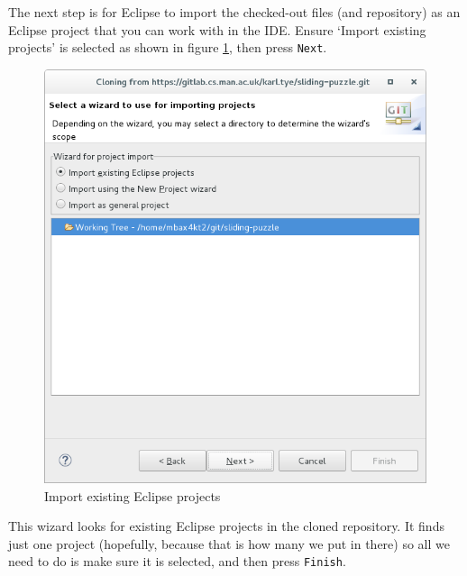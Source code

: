 \documentclass[
]{book}
\begin{document}
The next step is for Eclipse to import the checked-out files (and repository) as an Eclipse project that you can work with in the IDE. Ensure `Import existing projects' is selected as shown in figure \ref{fig:importExistingEclipseProjects-fig}, then press \texttt{Next}.

\begin{figure}

{\centering \includegraphics[width=0.8\linewidth]{images/importExistingEclipseProjects} 

}

\caption{Import existing Eclipse projects }\label{fig:importExistingEclipseProjects-fig}
\end{figure}

This wizard looks for existing Eclipse projects in the cloned repository. It finds just one project (hopefully, because that is how many we put in there) so all we need to do is make sure it is selected, and then press \texttt{Finish}.
\end{document}
